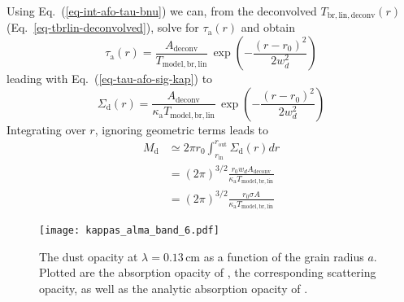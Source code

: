 \documentclass{aa}
\begin{document}
Using Eq.~(\ref{eq-int-afo-tau-bnu}) we can, from the deconvolved
$T_{\mathrm{br,lin,deconv}}(r)$ (Eq.~\ref{eq-tbrlin-deconvolved}), solve for
$\tau_{\mathrm{a}}(r)$ and obtain
\begin{equation}
  \tau_{\mathrm{a}}(r)=\frac{A_{\mathrm{deconv}}}{T_{\mathrm{model,br,lin}}}\,
  \exp\left(-\frac{(r-r_0)^2}{2w_d^2}\right)
\end{equation}
leading with Eq.~(\ref{eq-tau-afo-sig-kap}) to
\begin{equation}
  \Sigma_{\mathrm{d}}(r)=\frac{A_{\mathrm{deconv}}}{\kappa_{\mathrm{a}}T_{\mathrm{model,br,lin}}}\,
  \exp\left(-\frac{(r-r_0)^2}{2w_d^2}\right)
\end{equation}
Integrating over $r$, ignoring geometric terms leads to
\begin{equation}\label{eq-ringmass-from-obs}
  \begin{split}
    M_{\mathrm{d}} &\simeq 2\pi r_0\int_{r_{\mathrm{in}}}^{r_{\mathrm{out}}}\Sigma_{\mathrm{d}}(r)dr\\
    &= (2\pi)^{3/2}\frac{r_0w_dA_{\mathrm{deconv}}}{\kappa_{\mathrm{a}}T_{\mathrm{model,br,lin}}}\\
    &= (2\pi)^{3/2}\frac{r_0\sigma A}{\kappa_{\mathrm{a}}T_{\mathrm{model,br,lin}}}
  \end{split}
\end{equation}

\begin{figure}
\centerline{\texttt{[image: kappas\_alma\_band\_6.pdf]}}
\caption{\label{fig-opacities}The dust opacity at $\lambda=0.13\,\mathrm{cm}$
  as a function of the grain radius $a$. Plotted are the absorption opacity of
  \citet{2010A&A...512A..15R}, the corresponding scattering opacity, as well as
  the analytic absorption opacity of \citet{1997MNRAS.291..121I}.}
\end{figure}
\end{document}
